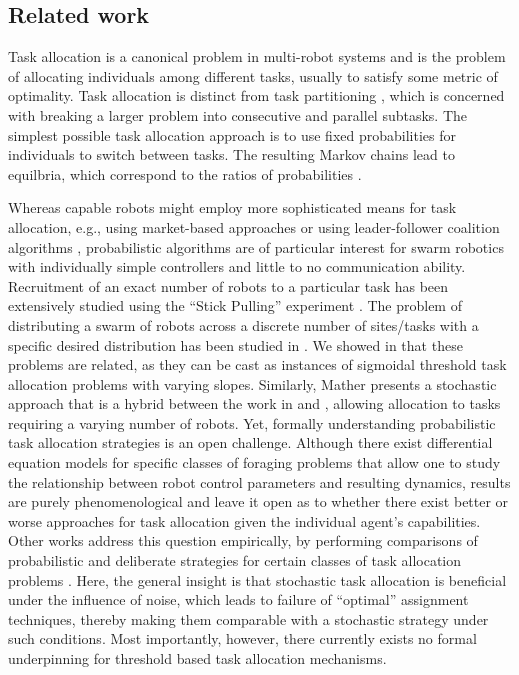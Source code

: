 \documentclass[smallextended]{svjour3}       %
\begin{document}
\subsection{Related work}
Task allocation is a canonical problem in multi-robot systems \citep{Gerkey2004,brambilla2013swarm} and is the problem of allocating individuals among different tasks, usually to satisfy some metric of optimality. Task allocation is distinct from task partitioning \citep{pini2013task}, which is concerned with breaking a larger problem into consecutive and parallel subtasks. The simplest possible task allocation approach is to use fixed probabilities for individuals to switch between tasks. The resulting Markov chains lead to equilbria, which correspond to the ratios of probabilities \citep{Correll2008}. 


Whereas capable robots might employ more sophisticated means for task allocation, e.g., using market-based approaches \citep{Amstutz2008,Vig2007,choi2009consensus} or using  leader-follower coalition algorithms \citep{Chen2011}, probabilistic algorithms are of particular interest for swarm robotics with individually simple controllers \citep{Dantu2012} and little to no communication ability. Recruitment of an exact number of robots to a particular task has been extensively studied using the ``Stick Pulling'' experiment \citep{Lerman2001,Martinoli2004}. The problem of distributing a swarm of robots across a discrete number of sites/tasks with a specific desired distribution has been studied in \citep{Berman2009,Correll2008}. We showed in \citep{Kanakia2014} that these problems are related, as they can be cast as instances of sigmoidal threshold task allocation problems with varying slopes. Similarly, Mather \citep{Mather2010} presents a stochastic approach that is a hybrid between the work in \citep{Berman2009} and \citep{Martinoli2004}, allowing allocation to tasks requiring a varying number of robots. Yet, formally understanding probabilistic task allocation strategies is an open challenge. Although there exist differential equation models for specific classes of foraging problems \citep{lerman2006analysis,liu2010modelling} that allow one to study the relationship between robot control parameters and resulting dynamics, results are purely phenomenological and leave it open as to whether there exist better or worse approaches for task allocation given the individual agent's capabilities. Other works address this question empirically, by performing comparisons of probabilistic and deliberate strategies for certain classes of task allocation problems \citep{Kalra2006,correll2007coordination}. Here, the general insight is that stochastic task allocation is beneficial under the influence of noise, which leads to failure of ``optimal'' assignment techniques, thereby making them comparable with a stochastic strategy under such conditions. Most importantly, however, there currently exists no formal underpinning for threshold based task allocation mechanisms.
\end{document}
